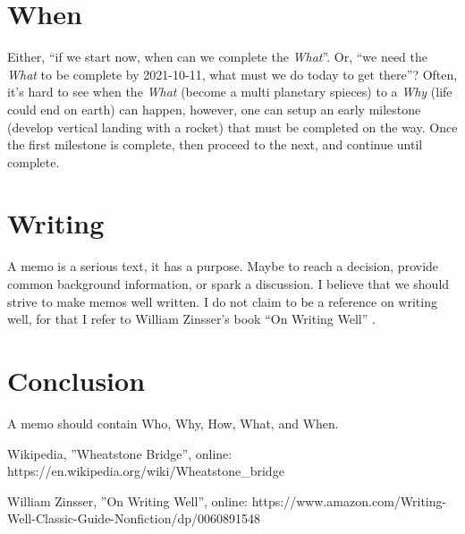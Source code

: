 \documentclass[technote,10pt,a4paper]{IEEEtran}
\begin{document}
\section{When}
Either, ``if we start now, when can we complete the \textit{What}''. Or, ``we
need the \textit{What} to be complete by 2021-10-11, what must we do today to
get there''? Often, it’s hard to see when the \textit{What}  (become a multi
planetary spieces) to a \textit{Why} (life could end on earth) can happen,
however, one can setup an early milestone (develop vertical landing with a
rocket) that must be completed on the way. Once the first milestone is complete,
then proceed to the next, and continue until complete.

\section{Writing}
A memo is a serious text, it has a purpose. Maybe to reach a decision, provide common background information, or spark a discussion. I believe that we should strive to make memos well written. I do not claim to be a reference on writing well, for that I refer to William Zinsser’s book ``On Writing Well'' \cite{oww}.

\section{Conclusion}
A memo should contain Who, Why, How, What, and When.




\begin{thebibliography}{1}
  \providecommand{\url}[1]{#1}

  Wikipedia, ''{Wheatstone Bridge}'', online:
  \url{https://en.wikipedia.org/wiki/Wheatstone_bridge}

  William Zinsser, ''{On Writing Well}'', online: \url{https://www.amazon.com/Writing-Well-Classic-Guide-Nonfiction/dp/0060891548}


\end{thebibliography}
\end{document}
